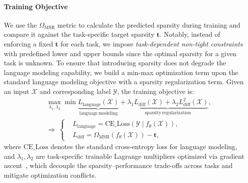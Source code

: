 \paragraph{Training Objective}
We use the $\Omega_{\mathrm{MSR}}$ metric to calculate the predicted sparsity during training and compare it against the task-specific target sparsity $\boldsymbol{t}$. 
Notably, instead of enforcing a fixed $\boldsymbol{t}$ for each task, we impose \emph{task-dependent non-tight constraints} with predefined lower and upper bounds since the optimal sparsity for a given task is unknown. 
To ensure that introducing sparsity does not degrade the language modeling capability, we build a min-max optimization term upon the standard language modeling objective with a sparsity regularization term.
Given an input $\mathcal{X}$ and corresponding label $\mathcal{Y}$, the training objective is:
\begin{equation}
\begin{aligned}
& \max_{\lambda_1, \lambda_2} \min \underbrace{L_{\mathrm{language}}(\mathcal{X})}_{\mathrm{language~modeling}} + \underbrace{\lambda_1 L_{\mathrm{diff}}(\mathcal{X}) + \lambda_2 L_{\mathrm{diff}}^{2}(\mathcal{X})}_{\mathrm{sparsity~regularization}}, \\
& \Rightarrow~\left\{
\begin{aligned}
& L_{\mathrm{language}} = \mathrm{CE\_Loss}\left(\mathcal{Y}\mid f_{\theta}(\mathcal{X})\right),\\
& L_{\mathrm{diff}} = \Omega_{\mathrm{MSR}}\left(f_\theta(\mathcal{X})\right) - \boldsymbol{t}, \
\end{aligned}
\right.
\end{aligned}
\label{equ:training_ojective}
\end{equation}
where $\mathrm{CE\_Loss}$ denotes the standard cross-entropy loss for language modeling, and $\lambda_1, \lambda_2$ are task-specific trainable Lagrange multipliers optimized via gradient ascent~\citep{bhaskar2025cache}, which decouple the sparsity--performance trade-offs across tasks and mitigate optimization conflicts.


